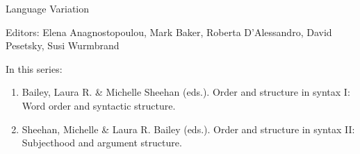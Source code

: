 {\large Language Variation}

\bigskip

Editors:   Elena Anagnostopoulou,
    Mark Baker,
    Roberta D’Alessandro,
    David Pesetsky,
    Susi Wurmbrand


\bigskip

In this series:

\begin{enumerate}
\item Bailey, Laura R. \& Michelle Sheehan (eds.). Order and structure in syntax I: Word order and syntactic structure.
\item Sheehan, Michelle \& Laura R. Bailey (eds.).  Order and structure in syntax II: Subjecthood and argument structure.
\end{enumerate}



\vfill



